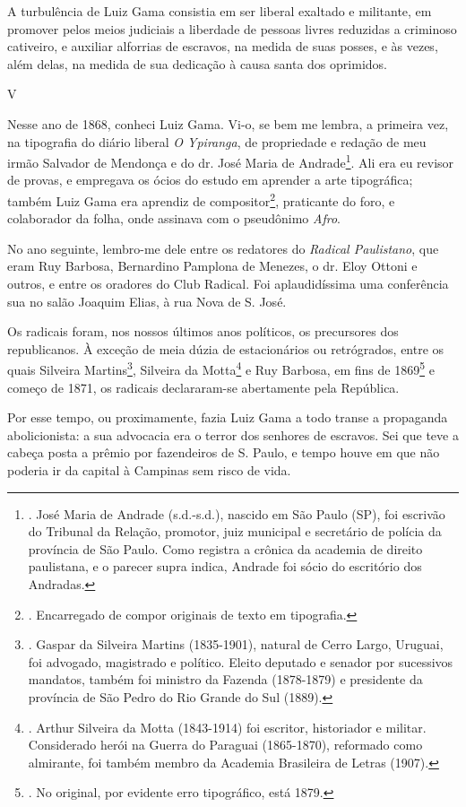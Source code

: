 A turbulência de Luiz Gama consistia em ser liberal exaltado e
militante, em promover pelos meios judiciais a liberdade de pessoas
livres reduzidas a criminoso cativeiro, e auxiliar alforrias de
escravos, na medida de suas posses, e às vezes, além delas, na medida de
sua dedicação à causa santa dos oprimidos.

V

Nesse ano de 1868, conheci Luiz Gama. Vi-o, se bem me lembra, a primeira
vez, na tipografia do diário liberal \emph{O Ypiranga}, de propriedade e
redação de meu irmão Salvador de Mendonça e do dr. José Maria de
Andrade\footnote{. José Maria de Andrade (s.d.-s.d.), nascido em São
  Paulo (SP), foi escrivão do Tribunal da Relação, promotor, juiz
  municipal e secretário de polícia da província de São Paulo. Como
  registra a crônica da academia de direito paulistana, e o parecer
  supra indica, Andrade foi sócio do escritório dos Andradas.}. Ali era
eu revisor de provas, e empregava os ócios do estudo em aprender a arte
tipográfica; também Luiz Gama era aprendiz de compositor\footnote{.
  Encarregado de compor originais de texto em tipografia.}, praticante
do foro, e colaborador da folha, onde assinava com o pseudônimo
\emph{Afro}.

No ano seguinte, lembro-me dele entre os redatores do \emph{Radical
Paulistano}, que eram Ruy Barbosa, Bernardino Pamplona de Menezes, o dr.
Eloy Ottoni e outros, e entre os oradores do Club Radical. Foi
aplaudidíssima uma conferência sua no salão Joaquim Elias, à rua Nova de
S. José.

Os radicais foram, nos nossos últimos anos políticos, os precursores dos
republicanos. À exceção de meia dúzia de estacionários ou retrógrados,
entre os quais Silveira Martins\footnote{. Gaspar da Silveira Martins
  (1835-1901), natural de Cerro Largo, Uruguai, foi advogado, magistrado
  e político. Eleito deputado e senador por sucessivos mandatos, também
  foi ministro da Fazenda (1878-1879) e presidente da província de São
  Pedro do Rio Grande do Sul (1889).}, Silveira da Motta\footnote{.
  Arthur Silveira da Motta (1843-1914) foi escritor, historiador e
  militar. Considerado herói na Guerra do Paraguai (1865-1870),
  reformado como almirante, foi também membro da Academia Brasileira de
  Letras (1907).} e Ruy Barbosa, em fins de 1869\footnote{. No original,
  por evidente erro tipográfico, está 1879.} e começo de 1871, os
radicais declararam-se abertamente pela República.

Por esse tempo, ou proximamente, fazia Luiz Gama a todo transe a
propaganda abolicionista: a sua advocacia era o terror dos senhores de
escravos. Sei que teve a cabeça posta a prêmio por fazendeiros de S.
Paulo, e tempo houve em que não poderia ir da capital à Campinas sem
risco de vida.

